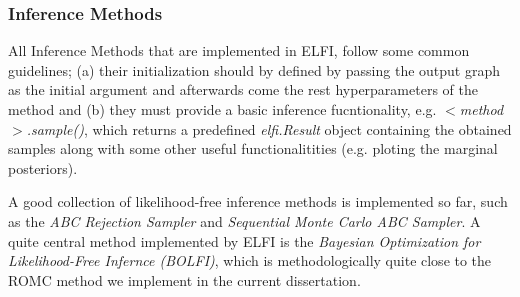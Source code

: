 \subsubsection{Inference Methods}
\label{sec:inference-methods}

All Inference Methods that are implemented in ELFI, follow some common
guidelines; (a) their initialization should by defined by passing the
output graph as the initial argument and afterwards come the rest
hyperparameters of the method and (b) they must provide a basic
inference fucntionality, e.g. $<$\textit{method}$>$\textit{.sample()},
which returns a predefined \textit{elfi.Result} object containing the
obtained samples along with some other useful functionalitities
(e.g. ploting the marginal posteriors).

A good collection of likelihood-free inference methods is implemented
so far, such as the \textit{ABC Rejection Sampler} and
\textit{Sequential Monte Carlo ABC Sampler}. A quite central method
implemented by ELFI is the \textit{Bayesian Optimization for
  Likelihood-Free Infernce (BOLFI)}, which is methodologically quite
close to the ROMC method we implement in the current dissertation.



